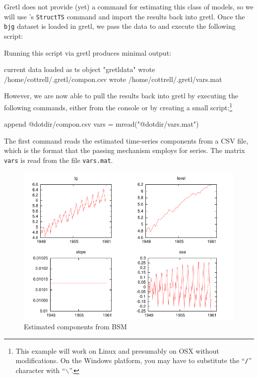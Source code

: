 Gretl does not provide (yet) a command for estimating this class
of models, so we will use 's \texttt{StructTS} command and
import the results back into gretl. Once the \texttt{bjg}
dataset is loaded in gretl, we pass the data to  and execute
the following script:

Running this script via gretl produces minimal output:
\begin{code}
current data loaded as ts object "gretldata"
wrote /home/cottrell/.gretl/compon.csv 
wrote /home/cottrell/.gretl/vars.mat 
\end{code}
However, we are now able to pull the results back into gretl by
executing the following commands, either from the console or by
creating a small script:\footnote{This example will work on Linux and
  presumably on OSX without modifications. On the Windows platform,
  you may have to substitute the ``\texttt{/}'' character with
  ``$\backslash$''.}
\begin{code}
append @dotdir/compon.csv
vars = mread("@dotdir/vars.mat")
\end{code}
The first command reads the estimated time-series components from a
CSV file, which is the format that the passing mechanism employs for
series. The matrix \texttt{vars} is read from the file
\texttt{vars.mat}.

\begin{figure}[htbp]
  \centering
  \includegraphics{figures/BSM-output}
  \caption{Estimated components from BSM}
  \label{fig:BSM-output}
\end{figure}

